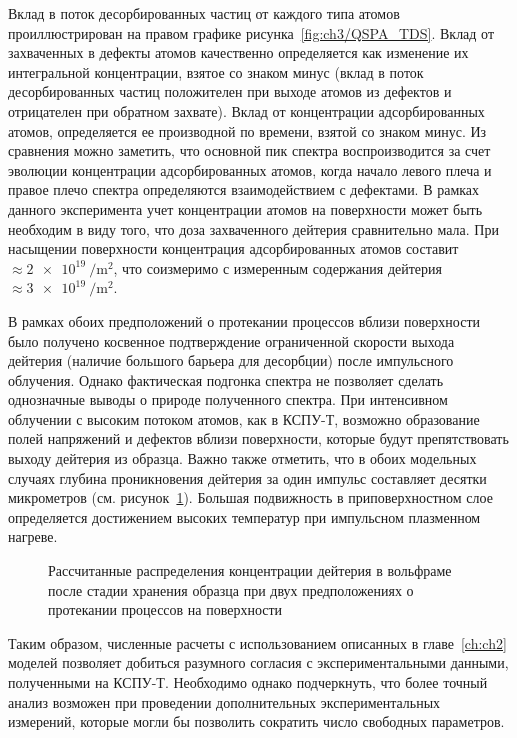 Вклад в поток десорбированных частиц от каждого типа атомов проиллюстрирован на правом графике рисунка~\cref{fig:ch3/QSPA_TDS}. Вклад от захваченных в дефекты атомов качественно определяется как изменение их интегральной концентрации, взятое со знаком минус (вклад в поток десорбированных частиц положителен при выходе атомов из дефектов и отрицателен при обратном захвате). Вклад от концентрации адсорбированных атомов, определяется ее производной по времени, взятой со знаком минус. Из сравнения можно заметить, что основной пик спектра воспроизводится за счет эволюции концентрации адсорбированных атомов, когда начало левого плеча и правое плечо спектра определяются взаимодействием с дефектами. В рамках данного эксперимента учет концентрации атомов на поверхности может быть необходим в виду того, что доза захваченного дейтерия сравнительно мала. При насыщении поверхности концентрация адсорбированных атомов составит \( \approx \SI{2e19}{\per\meter\squared} \), что соизмеримо с измеренным содержания дейтерия \( \approx \SI{3e19}{\per\meter\squared}\).

В рамках обоих предположений о протекании процессов вблизи поверхности было получено косвенное подтверждение ограниченной скорости выхода дейтерия (наличие большого барьера для десорбции) после импульсного облучения. Однако фактическая подгонка спектра не позволяет сделать однозначные выводы о природе полученного спектра. При интенсивном облучении с высоким потоком атомов, как в КСПУ-Т, возможно образование полей напряжений и дефектов вблизи поверхности, которые будут препятствовать выходу дейтерия из образца. Важно также отметить, что в обоих модельных случаях глубина проникновения дейтерия за один импульс составляет десятки микрометров (см. рисунок~\cref{fig:ch3/QSPA_conc}). Большая подвижность в приповерхностном слое определяется достижением высоких температур при импульсном плазменном нагреве.
\begin{figure}[ht]
	\caption{Рассчитанные распределения концентрации дейтерия в вольфраме после стадии хранения образца при двух предположениях о протекании процессов на поверхности}\label{fig:ch3/QSPA_conc}
\end{figure}
Таким образом, численные расчеты с использованием описанных в главе~\cref{ch:ch2} моделей позволяет добиться разумного согласия с экспериментальными данными, полученными на КСПУ-Т. Необходимо однако подчеркнуть, что более точный анализ возможен при проведении дополнительных экспериментальных измерений, которые могли бы позволить сократить число свободных параметров.

